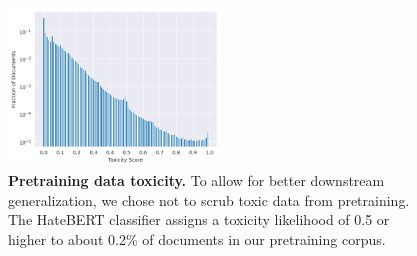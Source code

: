 \begin{figure}
\centering
\includegraphics[width=0.5\textwidth]{img/data_toxicity.png}
\caption{\textbf{Pretraining data toxicity.} To allow for better downstream generalization, we chose not to scrub toxic data from pretraining. The HateBERT classifier assigns a toxicity likelihood of 0.5 or higher to about 0.2\% of documents in our pretraining corpus.} \label{fig:data_toxicity}

\end{figure}

